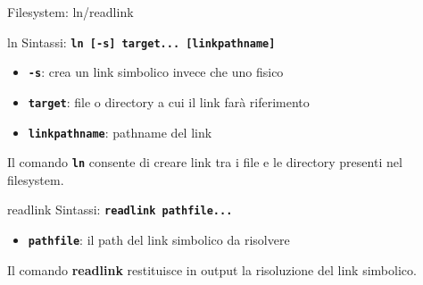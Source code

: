 \documentclass{beamer}
\begin{document}
    \begin{frame}{Filesystem: ln/readlink}
        \begin{block}{ln}
            \small
            Sintassi: \texttt{\textbf{ln [-s] target... [linkpathname]}}

            \begin{itemize}
                \item \texttt{\textbf{-s}}: crea un link simbolico invece che uno fisico
                \item \texttt{\textbf{target}}: file o directory a cui il link farà riferimento
                \item \texttt{\textbf{linkpathname}}: pathname del link
            \end{itemize}

            Il comando \texttt{\textbf{ln}} consente di creare link tra i file e le directory presenti nel filesystem.
        \end{block}

        \begin{block}{readlink}
            \small
            Sintassi: \texttt{\textbf{readlink pathfile...}}

            \begin{itemize}
                \item \texttt{\textbf{pathfile}}: il path del link simbolico da risolvere
            \end{itemize}

            Il comando \textbf{readlink} restituisce in output la risoluzione del link simbolico.
        \end{block}
    \end{frame}
\end{document}

